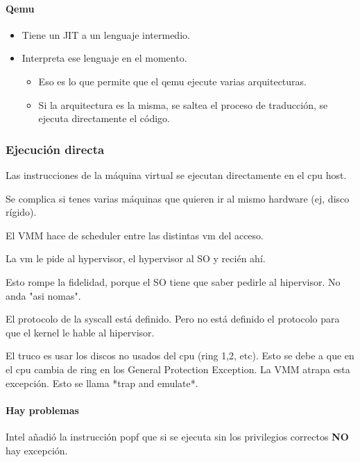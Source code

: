 \documentclass{article}
\begin{document}
\paragraph{Qemu}\label{qemu}

\begin{itemize}
\item
  Tiene un JIT a un lenguaje intermedio.
\item
  Interpreta ese lenguaje en el momento.

  \begin{itemize}
  \item
    Eso es lo que permite que el qemu ejecute varias arquitecturas.
  \item
    Si la arquitectura es la misma, se saltea el proceso de traducción,
    se ejecuta directamente el código.
  \end{itemize}
\end{itemize}

\subsubsection{Ejecución directa}\label{ejecuciuxf3n-directa}

Las instrucciones de la máquina virtual se ejecutan directamente en el
cpu host.

Se complica si tenes varias máquinas que quieren ir al mismo hardware
(ej, disco rígido).

El VMM hace de scheduler entre las distintas vm del acceso.

La vm le pide al hypervisor, el hypervisor al SO y recién ahí.

Esto rompe la fidelidad, porque el SO tiene que saber pedirle al
hipervisor. No anda "asi nomas".

El protocolo de la syscall está definido. Pero no está definido el
protocolo para que el kernel le hable al hipervisor.

El truco es usar los discos no usados del cpu (ring 1,2, etc). Esto se
debe a que en el cpu cambia de ring en los General Protection Exception.
La VMM atrapa esta excepción. Esto se llama *trap and emulate*.

\paragraph{Hay problemas}\label{hay-problemas}

Intel añadió la instrucción popf que si se ejecuta sin los privilegios
correctos \textbf{NO} hay excepción.
\end{document}
